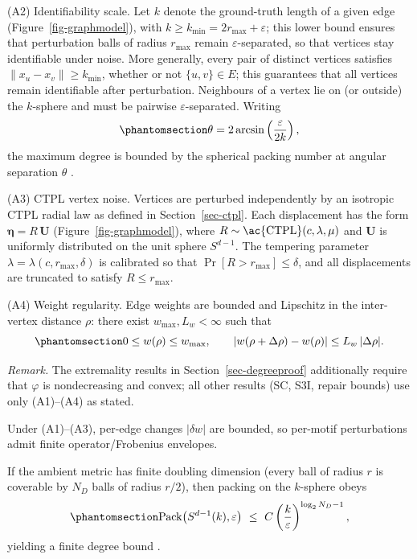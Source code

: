 \documentclass[
  11pt,
  letterpaper]{siamart251216}
\begin{document}
(A2) Identifiability scale. Let \(k\) denote the ground-truth length of
a given edge (Figure~\ref{fig-graphmodel}), with
\(k \ge k_{\min} = 2r_{\max}+\varepsilon\); this lower bound ensures
that perturbation balls of radius \(r_{\max}\) remain
\(\varepsilon\)-separated, so that vertices stay identifiable under
noise. More generally, every pair of distinct vertices satisfies
\(\|x_u-x_v\|\ge k_{\min}\), whether or not \(\{u,v\}\in E\); this
guarantees that all vertices remain identifiable after perturbation.
Neighbours of a vertex lie on (or outside) the \(k\)-sphere and must be
pairwise \(\varepsilon\)-separated. Writing
\begin{equation}\phantomsection\label{eq-theta}{
\theta = 2\arcsin\left(\frac{\varepsilon}{2k}\right),
}\end{equation} the maximum degree is bounded by the spherical packing
number at angular separation \(\theta\) \citep{ConwaySloane1999}.

(A3) \ac{CTPL} vertex noise. Vertices are perturbed independently by an
isotropic \ac{CTPL} radial law as defined in Section~\ref{sec-ctpl}.
Each displacement has the form \(\boldsymbol{\eta} = R\,\mathbf{U}\)
(Figure~\ref{fig-graphmodel}), where
\(R \sim \text{\ac{CTPL}}(c,\lambda,\mu)\) and \(\mathbf{U}\) is
uniformly distributed on the unit sphere \(S^{d-1}\). The tempering
parameter \(\lambda=\lambda(c,r_{\max},\delta)\) is calibrated so that
\(\Pr[R>r_{\max}]\le\delta\), and all displacements are truncated to
satisfy \(R\le r_{\max}\).

(A4) Weight regularity. Edge weights are bounded and Lipschitz in the
inter-vertex distance \(\rho\): there exist \(w_{\max},L_w<\infty\) such
that \begin{equation}\phantomsection\label{eq-weight-lipschitz}{
0\le w(\rho)\le w_{\max}, \qquad |w(\rho+\Delta \rho)-w(\rho)|\le L_w\,|\Delta \rho|.
}\end{equation}

\emph{Remark.} The extremality results in Section~\ref{sec-degreeproof}
additionally require that \(\varphi\) is nondecreasing and convex; all
other results (SC, S3I, repair bounds) use only (A1)--(A4) as stated.

Under (A1)--(A3), per-edge changes \(|\delta w|\) are bounded, so
per-motif perturbations admit finite operator/Frobenius envelopes.

If the ambient metric has finite doubling dimension (every ball of
radius \(r\) is coverable by \(N_D\) balls of radius \(r/2\)), then
packing on the \(k\)-sphere obeys
\begin{equation}\phantomsection\label{eq-doubling-pack}{
\mathrm{Pack}\big(S^{d-1}(k),\varepsilon\big) \ \le\ C\left(\frac{k}{\varepsilon}\right)^{\log_2 N_D - 1},
}\end{equation} yielding a finite degree bound \citep{Heinonen2001}.
\end{document}
